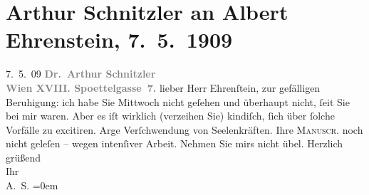 

         
         \newcommand{\erwaehntePersonen}{Personen: Albert Ehrenstein}
         \newcommand{\erwaehnteInstitutionen}{}
         \newcommand{\erwaehnteOrte}{Orte: Edmund-Weiß-Gasse, Wien}
         \newcommand{\erwaehnteWerke}{Werke: Apaturien, Tod des Zehir eddin Muhammed Baber, Tubutsch}
               \section[Arthur Schnitzler an Albert Ehrenstein, 7. 5. 1909]{ Arthur Schnitzler an Albert Ehrenstein, 7. 5. 1909}\nopagebreak{}\rehead{ }\begin{ledgroupsized}[t]{13cm}\normalsize\beginnumbering \toendnotes[C]{\smallbreak\pagebreak[2]} 
\toendnotes[C]{\smallbreak}\pstart
           \raggedleft{}{\pb}7. 5. 09\pend
           \pstart
           \textcolor{gray}{\textbf{Dr. Arthur Schnitzler}}{\\}\textcolor{gray}{\textbf{Wien XVIII. Spoettelgasse 7.}}\pend
           \pstart{}lieber Herr Ehrenſtein,\pend\pstart
           zur gefälligen Beruhigung: ich habe Sie Mittwoch nicht geſehen und
                    überhaupt nicht, ſeit Sie bei mir waren.\pend
           \pstart
           Aber es iſt wirklich (verzeihen Sie) kindiſch, ſich über ſolche Vorfälle zu
                    excitiren. Arge Verſchwendung von Seelenkräften. Ihre \textsc{Manuscr.} noch nicht geleſen – {\pb}wegen intenſiver Arbeit.
                    Nehmen Sie mirs nicht übel.\pend
           \pstart
           Herzlich grüßend{\\[\baselineskip]}Ihr{\\[\baselineskip]}\spacefill\mbox{A. S.}\pend
           \leftskip=0em{}
         
         \endnumbering{}\end{ledgroupsized}  \newcommand{\dateiname}{L01841}\newcommand{\titel}{Arthur Schnitzler an Albert Ehrenstein, 7. 5. 1909}\newcommand{\editorInnen}{Martin Anton Müller und Gerd-Hermann Susen}
      